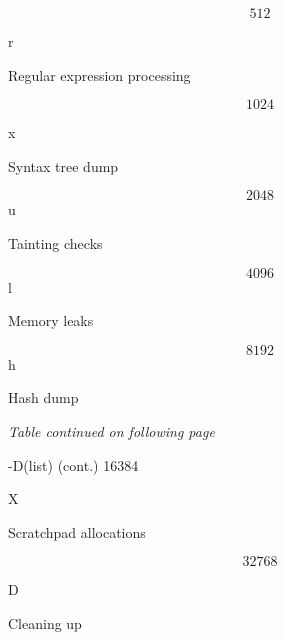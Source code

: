 \documentclass[a4paper,11pt]{book}
\begin{document}
\noindent 

\[512\] 


\noindent r

\noindent 

\noindent Regular expression processing

\noindent 

\noindent 

\[1024\] 


\noindent x

\noindent 

\noindent Syntax tree dump

\noindent 

\noindent 

\[2048\] 
u

\noindent 

\noindent Tainting checks

\noindent 

\noindent 

\[4096\] 
l

\noindent 

\noindent Memory leaks

\noindent 

\noindent 

\[8192\] 
h

\noindent 

\noindent Hash dump

\noindent 

\noindent 

\noindent 

\noindent 

\noindent 

\noindent \textit{Table continued on following page}

\noindent 

\noindent -D(list) (cont.) 16384

\noindent X

\noindent 

\noindent Scratchpad allocations

\noindent 

\noindent 

\[32768\] 


\noindent D

\noindent 

\noindent Cleaning up

\noindent 

\noindent 

\noindent 

\noindent 
\end{document}

